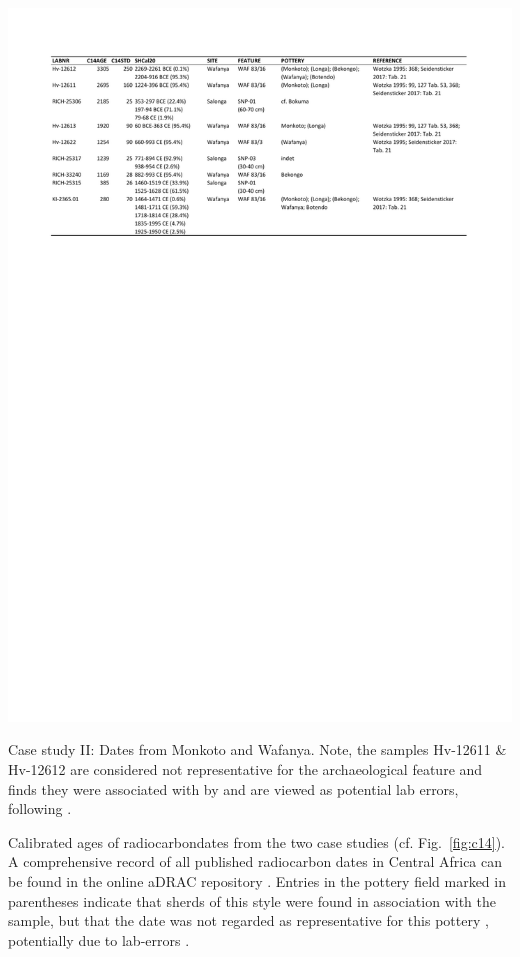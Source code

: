 \documentclass[a4paper]{article}
\begin{document}
\begin{table}[p]
	\begin{subtable}[t]{\textwidth}
		\centering
		\includegraphics[width=\textwidth]{Tab_14C_ICB.pdf}
		\caption{Case study II: Dates from Monkoto and Wafanya. Note, the samples Hv-12611 \& Hv-12612 are considered not representative for the archaeological feature and finds they were associated with by \citet[99, 127 Tab.~53, 368]{Wotzka.1995} and are viewed as potential lab errors, following \citet{Geyh.1990}.}
		\label{tbl:c14_slg}
	\end{subtable}
	
	\caption{Calibrated ages of radiocarbondates from the two case studies (cf. Fig.~\ref{fig:c14}). A comprehensive record of all published radiocarbon dates in Central Africa can be found in the online aDRAC repository \cite{Seidensticker.2021f}. Entries in the pottery field marked in parentheses indicate that sherds of this style were found in association with the sample, but that the date was not regarded as representative for this pottery \citep[193--204]{Wotzka.1995, Seidensticker.2021e}, potentially due to lab-errors \citep{Geyh.1990}.}
	\label{tab:14C}	
\end{table}

\newpage


\end{document}
